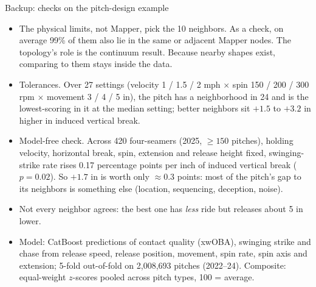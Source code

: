 \documentclass[aspectratio=169]{beamer}
\begin{document}
\begin{frame}{Backup: checks on the pitch-design example}
\begin{itemize}\small
  \item \alert{The physical limits, not Mapper, pick the 10 neighbors.} As a check, on average 99\% of them also lie in the same or adjacent Mapper nodes. The topology's role is the continuum result. Because nearby shapes exist, comparing to them stays inside the data.
  \item \alert{Tolerances.} Over 27 settings (velocity 1 / 1.5 / 2 mph $\times$ spin 150 / 200 / 300 rpm $\times$ movement 3 / 4 / 5 in), the pitch has a neighborhood in 24 and is the lowest-scoring in it at the median setting; better neighbors sit $+1.5$ to $+3.2$ in higher in induced vertical break.
  \item \alert{Model-free check.} Across 420 four-seamers (2025, $\ge 150$ pitches), holding velocity, horizontal break, spin, extension and release height fixed, swinging-strike rate rises 0.17 percentage points per inch of induced vertical break ($p = 0.02$). So $+1.7$ in is worth only $\approx 0.3$ points: most of the pitch's gap to its neighbors is something else (location, sequencing, deception, noise).
  \item \alert{Not every neighbor agrees:} the best one has \emph{less} ride but releases about 5 in lower.
  \item Model: CatBoost predictions of contact quality (xwOBA), swinging strike and chase from release speed, release position, movement, spin rate, spin axis and extension; 5-fold out-of-fold on 2{,}008{,}693 pitches (2022--24). Composite: equal-weight $z$-scores pooled across pitch types, 100 = average.
\end{itemize}
\end{frame}
\end{document}
